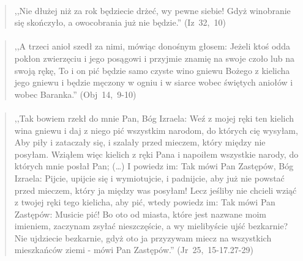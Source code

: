\documentclass[10pt,a4paper,oneside]{article}
\begin{document}
\paragraph{}
\begin{quote}
,,Nie dłużej niż za rok będziecie drżeć, wy pewne siebie! Gdyż winobranie się skończyło, a owocobrania już nie będzie.'' \mbox{(Iz 32, 10)}
\end{quote}
\paragraph{}
\begin{quote}
,,A trzeci anioł szedł za nimi, mówiąc donośnym głosem: Jeżeli ktoś odda pokłon zwierzęciu i jego posągowi i przyjmie znamię na swoje czoło lub na swoją rękę, To i on pić będzie samo czyste wino gniewu Bożego z kielicha jego gniewu i będzie męczony w ogniu i w siarce wobec świętych aniołów i wobec Baranka.'' \mbox{(Obj 14, 9-10)}
\end{quote}
\paragraph{}
\begin{quote}
,,Tak bowiem rzekł do mnie Pan, Bóg Izraela: Weź z mojej ręki ten kielich wina gniewu i daj z niego pić wszystkim narodom, do których cię wysyłam, Aby piły i zataczały się, i szalały przed mieczem, który między nie posyłam. Wziąłem więc kielich z ręki Pana i napoiłem wszystkie narody, do których mnie posłał Pan; (\ldots) I powiedz im: Tak mówi Pan Zastępów, Bóg Izraela: Pijcie, upijcie się i wymiotujcie, i padnijcie, aby już nie powstać przed mieczem, który ja między was posyłam! Lecz jeśliby nie chcieli wziąć z twojej ręki tego kielicha, aby pić, wtedy powiedz im: Tak mówi Pan Zastępów: Musicie pić! Bo oto od miasta, które jest nazwane moim imieniem, zaczynam zsyłać nieszczęście, a wy mielibyście ujść bezkarnie? Nie ujdziecie bezkarnie, gdyż oto ja przyzywam miecz na wszystkich mieszkańców ziemi - mówi Pan Zastępów.'' \mbox{(Jr 25, 15-17.27-29)}
\end{quote}
\end{document}
